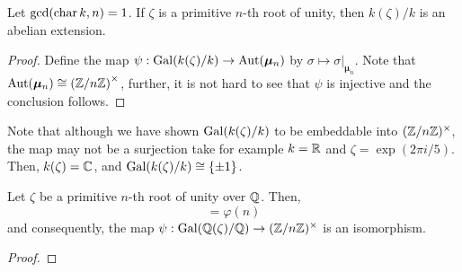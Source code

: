\begin{proposition}
    Let $\gcd(\operatorname{char} k, n) = 1$. If $\zeta$ is a primitive $n$-th root of unity, then $k(\zeta)/k$ is an abelian extension.
\end{proposition}
\begin{proof}
    Define the map $\psi:\operatorname{Gal}(k(\zeta)/k)\to\operatorname{Aut}(\bm\mu_n)$ by $\sigma\mapsto\sigma|_{\bm\mu_n}$. Note that $\operatorname{Aut}(\bm\mu_n)\cong\left(\mathbb{Z}/n\mathbb{Z}\right)^\times$, further, it is not hard to see that $\psi$ is injective and the conclusion follows.
\end{proof}

Note that although we have shown $\operatorname{Gal}(k(\zeta)/k)$ to be embeddable into $(\mathbb{Z}/n\mathbb{Z})^\times$, the map may not be a surjection take for example $k = \mathbb{R}$ and $\zeta = \exp(2\pi i/5)$. Then, $k(\zeta) = \mathbb{C}$, and $\operatorname{Gal}(k(\zeta)/k)\cong\{\pm 1\}$.

\begin{proposition}
    Let $\zeta$ be a primitive $n$-th root of unity over $\mathbb{Q}$. Then, 
    \begin{equation*}
        [\Q(\zeta):\Q] = \varphi(n)
    \end{equation*}
    and consequently, the map $\psi:\operatorname{Gal}(\mathbb{Q}(\zeta)/\mathbb{Q})\to(\mathbb{Z}/n\mathbb{Z})^\times$ is an isomorphism.
\end{proposition}
\begin{proof}

\end{proof}
